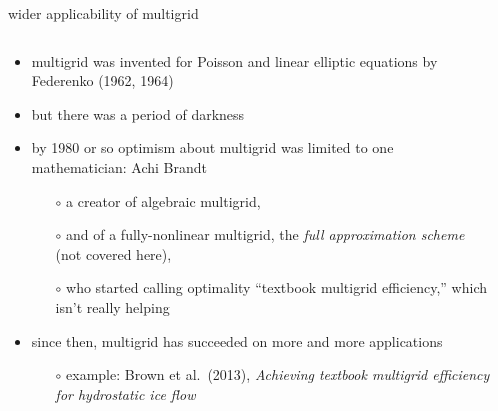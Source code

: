 \documentclass[hide notes,intlimits,usenames,dvipsnames]{beamer}
\begin{document}
\begin{frame}{wider applicability of multigrid}

\begin{columns}
\begin{column}{0.8\textwidth}
\begin{itemize}
\item multigrid was invented for Poisson and linear elliptic equations by Federenko (1962, 1964)
\item but there was a period of darkness
\item by 1980 or so optimism about multigrid was limited to one mathematician: Achi Brandt
    \begin{itemize}
    \item[$\circ$] a creator of algebraic multigrid,
    \item[$\circ$] and of a fully-nonlinear multigrid, the \emph{full approximation scheme} (not covered here),
    \item[$\circ$] who started calling optimality ``textbook multigrid efficiency,'' which isn't really helping
    \end{itemize}

\bigskip
\item since then, multigrid has succeeded on more and more applications
    \begin{itemize}
    \footnotesize
    \item[$\circ$] example: Brown et al.~(2013), \emph{Achieving textbook multigrid efficiency for hydrostatic
ice flow}
    \end{itemize}
\end{itemize}
\end{column}

\begin{column}{0.2\textwidth}


\end{column}
\end{columns}
\end{frame}
\end{document}
